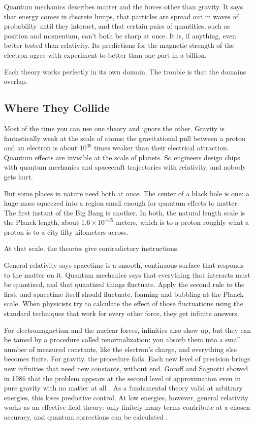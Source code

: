 Quantum mechanics describes matter and the forces other than gravity. It says that energy comes in discrete lumps, that particles are spread out in waves of probability until they interact, and that certain pairs of quantities, such as position and momentum, can't both be sharp at once. It is, if anything, even better tested than relativity. Its predictions for the magnetic strength of the electron agree with experiment to better than one part in a billion.

Each theory works perfectly in its own domain. The trouble is that the domains overlap.

\subsection{Where They Collide}

Most of the time you can use one theory and ignore the other. Gravity is fantastically weak at the scale of atoms; the gravitational pull between a proton and an electron is about \(10^{39}\) times weaker than their electrical attraction. Quantum effects are invisible at the scale of planets. So engineers design chips with quantum mechanics and spacecraft trajectories with relativity, and nobody gets hurt.

But some places in nature need both at once. The center of a black hole is one: a huge mass squeezed into a region small enough for quantum effects to matter. The first instant of the Big Bang is another. In both, the natural length scale is the Planck length, about \(1.6 \times 10^{-35}\) meters, which is to a proton roughly what a proton is to a city fifty kilometers across.

At that scale, the theories give contradictory instructions.

General relativity says spacetime is a smooth, continuous surface that responds to the matter on it. Quantum mechanics says that everything that interacts must be quantized, and that quantized things fluctuate. Apply the second rule to the first, and spacetime itself should fluctuate, foaming and bubbling at the Planck scale. When physicists try to calculate the effect of those fluctuations using the standard techniques that work for every other force, they get infinite answers.

For electromagnetism and the nuclear forces, infinities also show up, but they can be tamed by a procedure called renormalization: you absorb them into a small number of measured constants, like the electron's charge, and everything else becomes finite. For gravity, the procedure fails. Each new level of precision brings new infinities that need new constants, without end. Goroff and Sagnotti showed in 1986 that the problem appears at the second level of approximation even in pure gravity with no matter at all \cite{goroff1986}. As a fundamental theory valid at arbitrary energies, this loses predictive control. At low energies, however, general relativity works as an effective field theory: only finitely many terms contribute at a chosen accuracy, and quantum corrections can be calculated \cite{donoghue1994}.

